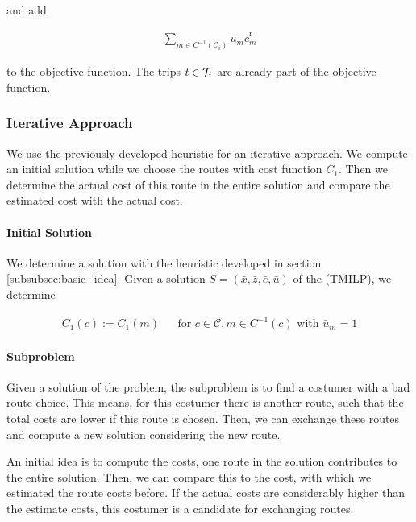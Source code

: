 and add 

\begin{align*}
	\sum_{m\in C^{-1}\left(\mathcal{C}_i\right)} u_m \tilde{c}^{\operatorname{r}}_m
\end{align*}

to the objective function. The trips $t\in\mathcal{T}_i$ are already part of the objective function.


\subsubsection{Iterative Approach}

We use the previously developed heuristic for an iterative approach. We compute an initial solution while we choose the routes with cost function $C_1$. Then we determine the actual cost of this route in the entire solution and compare the estimated cost with the actual cost.

\paragraph{Initial Solution} \parfill

We determine a solution with the heuristic developed in section \ref{subsubsec:basic_idea}. Given a solution $S=\left(\bar{x},\bar{z},\bar{e},\bar{u}\right)$ of the (TMILP), we determine 

\begin{align*}
	C_1(c) := C_1(m) && \text{for } c\in\mathcal{C}, m\in C^{-1}(c) \text{ with } \bar{u}_m = 1
\end{align*}

\paragraph{Subproblem} \parfill

Given a solution of the problem, the subproblem is to find a costumer with a bad route choice. This means, for this costumer there is another route, such that the total costs are lower if this route is chosen. Then, we can exchange these routes and compute a new solution considering the new route. 

An initial idea is to compute the costs, one route in the solution contributes to the entire solution. Then, we can compare this to the cost, with which we estimated the route costs before. If the actual costs are considerably higher than the estimate costs, this costumer is a candidate for exchanging routes.

